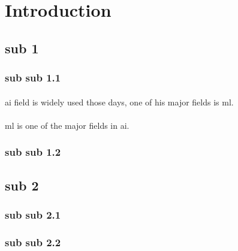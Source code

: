 \section{Introduction}
\subsection{sub 1}
\subsubsection{sub sub 1.1}
\paragraph{}
\ac{ai} field is widely used those days, one of his major fields is \ac{ml}.
\paragraph{}
\ac{ml} is one of the major fields in \ac{ai}.\cite{okba1}
\subsubsection{sub sub 1.2}
\subsection{sub 2}
\subsubsection{sub sub 2.1}
\subsubsection{sub sub 2.2}